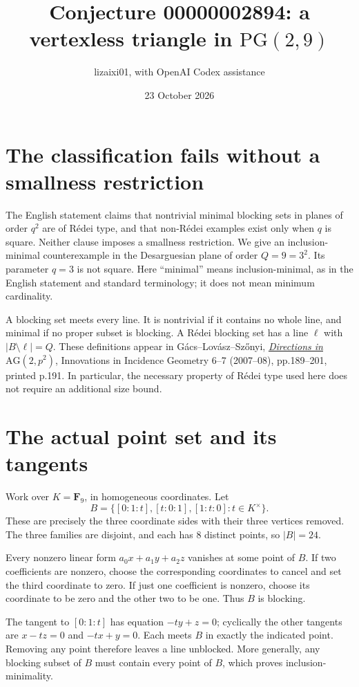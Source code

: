 \documentclass[11pt]{article}
\title{Conjecture 00000002894: a vertexless triangle in $\mathrm{PG}(2,9)$}
\author{lizaixi01, with OpenAI Codex assistance}
\date{23 October 2026}
\begin{document}
\maketitle
\section{The classification fails without a smallness restriction}
The English statement claims that nontrivial minimal blocking sets in
planes of order $q^2$ are of R\'edei type, and that non-R\'edei examples
exist only when $q$ is square. Neither clause imposes a smallness
restriction. We give an inclusion-minimal counterexample in the
Desarguesian plane of order $Q=9=3^2$. Its parameter $q=3$ is not square.
Here ``minimal'' means inclusion-minimal, as in the English statement
and standard terminology; it does not mean minimum cardinality.

A blocking set meets every line. It is nontrivial if it contains no
whole line, and minimal if no proper subset is blocking. A R\'edei
blocking set has a line $\ell$ with $|B\setminus\ell|=Q$.
These definitions appear in G\'acs--Lov\'asz--Sz\H{o}nyi,
\href{https://msp.org/iig/2008/6-1/iig-v6-n1-p12-p.pdf}
{\emph{Directions in $\mathrm{AG}(2,p^2)$}},
Innovations in Incidence Geometry 6--7 (2007--08), pp.189--201,
printed p.191. In particular, the necessary property of R\'edei type
used here does not require an additional size bound.

\section{The actual point set and its tangents}
Work over $K=\mathbf F_9$, in homogeneous coordinates. Let
\[
 B=\{[0:1:t],[t:0:1],[1:t:0]:t\in K^\times\}.
\]
These are precisely the three coordinate sides with their three
vertices removed. The three families are disjoint, and each has
$8$ distinct points, so $|B|=24$.

Every nonzero linear form $a_0x+a_1y+a_2z$ vanishes at some point of
$B$. If two coefficients are nonzero, choose the corresponding
coordinates to cancel and set the third coordinate to zero. If just
one coefficient is nonzero, choose its coordinate to be zero and
the other two to be one. Thus $B$ is blocking.

The tangent to $[0:1:t]$ has equation $-ty+z=0$; cyclically the other
tangents are $x-tz=0$ and $-tx+y=0$. Each meets $B$ in exactly the
indicated point. Removing any point therefore leaves a line unblocked.
More generally, any blocking subset of $B$ must contain every point
of $B$, which proves inclusion-minimality.
\end{document}
